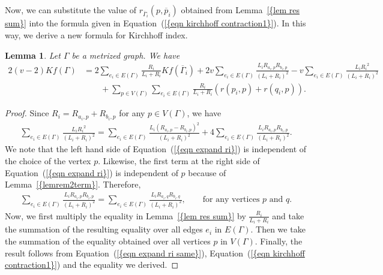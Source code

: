 \documentclass[12pt]{amsart}
\newtheorem{lemma}[theorem]{Lemma}
\theoremstyle{example}
\theoremstyle{definition}
\theoremstyle{notation}
\begin{document}
Now, we can substitute the value of $r_{{{\overline{\Gamma}}}_i}(p,{\overline{p}_i})$ obtained from {Lemma~\ref{{lem res sum}}} into the formula given in {Equation~(\ref{{eqn kirchhoff contraction1}})}. In this way, we derive a new formula for Kirchhoff index.
\begin{lemma}\label{lem Kirchhoff and res sum}
Let ${\Gamma}$ be a metrized graph. We have
\begin{equation*}
\begin{split}
2(v-2)Kf({\Gamma})&=2\sum_{e_i \in {E({\Gamma})}} \frac{R_{i}}{{L_{i}}+{R_{i}}} Kf({{\overline{\Gamma}}}_i) + 2v \sum_{e_i \in {E({\Gamma})}} \frac{{L_{i}} R_{a_{i},p} R_{b_{i},p}}{({L_{i}}+{R_{i}})^2}-v \sum_{e_i \in {E({\Gamma})}} \frac{{L_{i}} {R_{i}}^2}{({L_{i}}+{R_{i}})^2}\\
& \qquad + \sum_{p \in {V({\Gamma})}}\sum_{e_i \in {E({\Gamma})}} \frac{R_{i}}{{L_{i}}+{R_{i}}} (r({p_{i}},p)+r({q_{i}},p)).
\end{split}
\end{equation*}
\end{lemma}
\begin{proof}
Since ${R_{i}} = R_{a_{i},p} + R_{b_{i},p}$ for any $p \in {V({\Gamma})}$, we have
\begin{equation}\label{eqn expand ri}
\begin{split}
\sum_{e_i \in {E({\Gamma})}} \frac{{L_{i}} {R_{i}}^2}{({L_{i}}+{R_{i}})^2}=\sum_{e_i \in {E({\Gamma})}} \frac{{L_{i}} (R_{a_{i},p} - R_{b_{i},p})^2}{({L_{i}}+{R_{i}})^2}+4 \sum_{e_i \in {E({\Gamma})}} \frac{{L_{i}} R_{a_{i},p} R_{b_{i},p}}{({L_{i}}+{R_{i}})^2}.
\end{split}
\end{equation}
We note that the left hand side of {Equation~(\ref{{eqn expand ri}})} is independent of the choice of the vertex $p$. Likewise, the first term at the right side of {Equation~(\ref{{eqn expand ri}})} is independent of $p$ because of {Lemma~\ref{{lemrem2term}}}. Therefore,
\begin{equation}\label{eqn expand ri same}
\begin{split}
\sum_{e_i \in {E({\Gamma})}} \frac{{L_{i}} R_{a_{i},p} R_{b_{i},p}}{({L_{i}}+{R_{i}})^2} = \sum_{e_i \in {E({\Gamma})}} \frac{{L_{i}} R_{a_{i},q} R_{b_{i},q}}{({L_{i}}+{R_{i}})^2}, \qquad \text{for any vertices $p$ and $q$.}
\end{split}
\end{equation}
Now, we first multiply the equality in {Lemma~\ref{{lem res sum}}} by $\frac{R_{i}}{{L_{i}}+{R_{i}}}$ and take the summation of the resulting equality over all edges $e_i$ in ${E({\Gamma})}$. Then we take the summation of the equality obtained over all vertices $p$ in ${V({\Gamma})}$. Finally, the result follows from {Equation~(\ref{{eqn expand ri same}})}, {Equation~(\ref{{eqn kirchhoff contraction1}})} and the equality we derived.
\end{proof}
\end{document}
